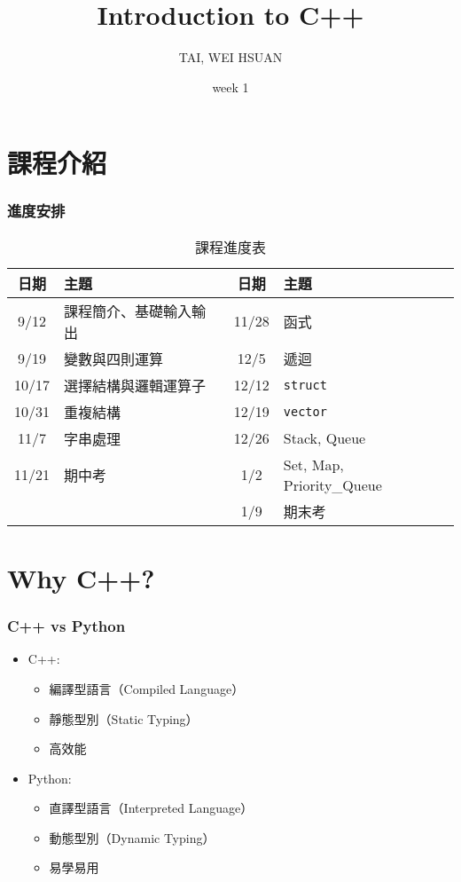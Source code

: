 \documentclass[xcolor=dvipsnames]{beamer}
\title{Introduction to C++}
\author{TAI, WEI HSUAN}
\date{week 1}
\begin{document}
	\begin{frame}
		\titlepage
	\end{frame}

    \section{課程介紹}
    \begin{frame}
        \frametitle{進度安排}
        \begin{table}[h]
        \centering
        \caption{課程進度表}
        \begin{tabular}{cl  cl}
        \toprule
        日期 & 主題 & 日期 & 主題 \\
        \midrule
        9/12  & 課程簡介、基礎輸入輸出   & 11/28 & 函式 \\
        9/19  & 變數與四則運算           & 12/5  & 遞迴 \\
        10/17 & 選擇結構與邏輯運算子     & 12/12 & \texttt{struct} \\
        10/31 & 重複結構                 & 12/19 & \texttt{vector} \\
        11/7  & 字串處理                 & 12/26 & Stack, Queue \\
        11/21 & 期中考                   & 1/2   & Set, Map, Priority\_Queue \\
            &                          & 1/9   & 期末考 \\
        \bottomrule
        \end{tabular}
        \end{table}
    \end{frame}

    \section{Why C++?}
    
    \begin{frame}
        \frametitle{C++ vs Python}
        \begin{itemize}
            \item C++:
            \begin{itemize}
                \item 編譯型語言（Compiled Language）
                \item 靜態型別（Static Typing）
                \item 高效能
            \end{itemize}
            \item Python:
            \begin{itemize}
                \item 直譯型語言（Interpreted Language）
                \item 動態型別（Dynamic Typing）
                \item 易學易用
            \end{itemize}
        \end{itemize}
    \end{frame}
\end{document}
